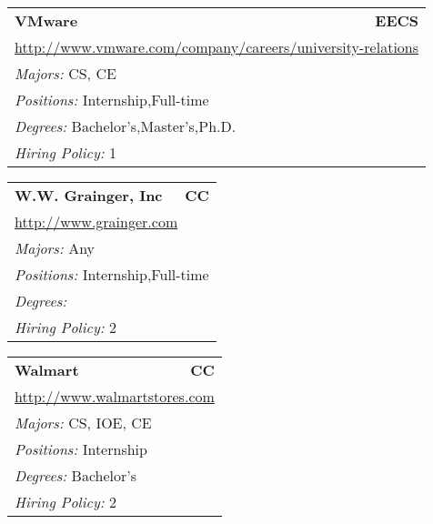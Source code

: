 \documentclass[twoside]{article}
\begin{document}
\begin{center}
\begin{multicols}{3}
\begin{FlushLeft}
\begin{minipage}{.9\columnwidth}
\end{minipage}
 
\begin{minipage}{.9\columnwidth}\begin{tabularx}{.95\columnwidth}{Xr}
                 {\Large\bf VMware} & {\Large\bf EECS}\\
    \multicolumn{2}{p{.95\columnwidth}}{\url{http://www.vmware.com/company/careers/university-relations}}\\
    \multicolumn{2}{p{.95\columnwidth}}{\emph{Majors:} CS, CE}\\
    \multicolumn{2}{p{.95\columnwidth}}{\emph{Positions:} Internship,Full-time}\\
    \multicolumn{2}{p{.95\columnwidth}}{\emph{Degrees:} Bachelor's,Master's,Ph.D.}\\
    \multicolumn{2}{p{.95\columnwidth}}{\emph{Hiring Policy:} 1}\\
    \end{tabularx}
    
\end{minipage}
 
\begin{minipage}{.9\columnwidth}\begin{tabularx}{.95\columnwidth}{Xr}
                 {\Large\bf W.W. Grainger, Inc} & {\Large\bf CC}\\
    \multicolumn{2}{p{.95\columnwidth}}{\url{http://www.grainger.com}}\\
    \multicolumn{2}{p{.95\columnwidth}}{\emph{Majors:} Any}\\
    \multicolumn{2}{p{.95\columnwidth}}{\emph{Positions:} Internship,Full-time}\\
    \multicolumn{2}{p{.95\columnwidth}}{\emph{Degrees:} }\\
    \multicolumn{2}{p{.95\columnwidth}}{\emph{Hiring Policy:} 2}\\
    \end{tabularx}
    
\end{minipage}
 
\begin{minipage}{.9\columnwidth}\begin{tabularx}{.95\columnwidth}{Xr}
                 {\Large\bf Walmart} & {\Large\bf CC}\\
    \multicolumn{2}{p{.95\columnwidth}}{\url{http://www.walmartstores.com}}\\
    \multicolumn{2}{p{.95\columnwidth}}{\emph{Majors:} CS, IOE, CE}\\
    \multicolumn{2}{p{.95\columnwidth}}{\emph{Positions:} Internship}\\
    \multicolumn{2}{p{.95\columnwidth}}{\emph{Degrees:} Bachelor's}\\
    \multicolumn{2}{p{.95\columnwidth}}{\emph{Hiring Policy:} 2}\\
    \end{tabularx}
    

\end{minipage}
\end{FlushLeft}
\end{multicols}
\end{center}
\end{document}
